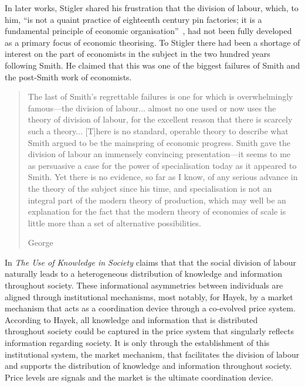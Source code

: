 In later works, Stigler shared his frustration that the division of labour, which, to him, ``is not a quaint practice of eighteenth century pin factories; it is a fundamental principle of economic organisation''~\citep[p.~135]{Stigler1951}, had not been fully developed as a primary focus of economic theorising. To Stigler there had been a shortage of interest on the part of economists in the subject in the two hundred years following Smith. He claimed that this was one of the biggest failures of Smith and the post-Smith work of economists.

\begin{quote}
The last of Smith's regrettable failures is one for which is overwhelmingly famous---the division of labour... almost no one used or now uses the theory of division of labour, for the excellent reason that there is scarcely such a theory... [T]here is no standard, operable theory to describe what Smith argued to be the mainspring of economic progress. Smith gave the division of labour an immensely convincing presentation---it seems to me as persuasive a case for the power of specialisation today as it appeared to Smith. Yet there is no evidence, so far as I know, of any serious advance in the theory of the subject since his time, and specialisation is not an integral part of the modern theory of production, which may well be an explanation for the fact that the modern theory of economies of scale is little more than a set of alternative possibilities.

\begin{flushright}
George \citet[p.~1209--1210]{Stigler1976}
\end{flushright}
\end{quote}

In \emph{The Use of Knowledge in Society} \citet{Hayek1945} claims that that the social division of labour naturally leads to a heterogeneous distribution of knowledge and information throughout society. These informational asymmetries between individuals are aligned through institutional mechanisms, most notably, for Hayek, by a market mechanism that acts as a coordination device through a co-evolved price system. According to Hayek, all knowledge and information that is distributed throughout society could be captured in the price system that singularly reflects information regarding society. It is only through the establishment of this institutional system, the market mechanism, that facilitates the division of labour and supports the distribution of knowledge and information throughout society. Price levels are signals and the market is the ultimate coordination device.

